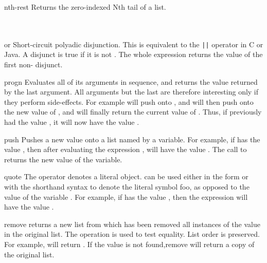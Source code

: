 \begin{okbcfspec}{nth-rest}
Returns the zero-indexed Nth tail of a list.\\
\\
\\
\end{okbcfspec}

\begin{okbcfspec}{or}
Short-circuit polyadic disjunction.  This is equivalent to the
\verb'||' operator in C or Java.  A disjunct is true if it is
not .  The whole  expression returns the
value of the first non- disjunct.
\end{okbcfspec}

\begin{okbcfspec}{progn}
Evaluates all of its arguments in sequence, and returns the
value returned by the last argument.  All arguments but the
last are therefore  interesting only if they perform
side-effects.  For example
will push  onto , and will then push
 onto the new value of , and will finally
return the current value of .
Thus, if  previously had the value ,
it will now have the value .
\end{okbcfspec}

\begin{okbcfspec}{push}
Pushes a new value onto a list named by a variable.  For
example, if  has the value , then
after evaluating the expression , 
will have the value .
The call to  returns the new value of the
variable.
\end{okbcfspec}

\begin{okbcfspec}{quote}
The  operator denotes a literal object.
 can be used either in the form  or with
the shorthand syntax  to denote the literal symbol foo,
as opposed to the value of the variable .  For example, if
 has the value , then the expression
 will
have the value .
\end{okbcfspec}

\begin{okbcfspec}{remove}
 returns a new list from
which has been removed all instances of the value in the
original list. The operation  is used to test
equality.
List order is preserved.
For example, 
will return .  If the value is not
found,remove will return a copy of the original list.
\end{okbcfspec}

